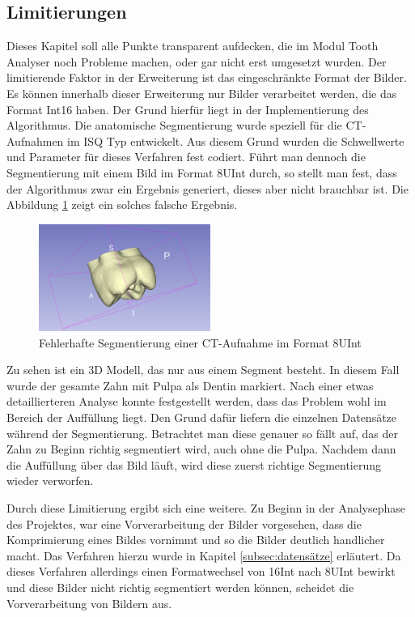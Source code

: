 \subsection{Limitierungen}
\label{sec:limitierungen} Dieses Kapitel soll alle Punkte transparent aufdecken,
die im Modul Tooth Analyser noch Probleme machen, oder gar nicht erst umgesetzt wurden.
Der limitierende Faktor in der Erweiterung ist das eingeschränkte Format der
Bilder. Es können innerhalb dieser Erweiterung nur Bilder verarbeitet werden,
die das Format \ac{Int16} haben. Der Grund hierfür liegt in der Implementierung
des Algorithmus. Die anatomische Segmentierung wurde speziell für die \ac{CT}-Aufnahmen
im \ac{ISQ} Typ entwickelt. Aus diesem Grund wurden die Schwellwerte und
Parameter für dieses Verfahren fest codiert. Führt man dennoch die Segmentierung
mit einem Bild im Format \ac{8UInt} durch, so stellt man fest, dass der
Algorithmus zwar ein Ergebnis generiert, dieses aber nicht brauchbar ist. Die
Abbildung \ref{fig:3d_error} zeigt ein solches falsche Ergebnis.

\begin{figure}[h]
	\centering
	\includegraphics[width=0.5\textwidth]{img/3d_view_error.png}
	\caption{Fehlerhafte Segmentierung einer \ac{CT}-Aufnahme im Format \ac{8UInt}}
	\label{fig:3d_error}
\end{figure}

Zu sehen ist ein 3D Modell, das nur aus einem Segment besteht. In diesem Fall wurde
der gesamte Zahn mit Pulpa als Dentin markiert. Nach einer etwas detaillierteren
Analyse konnte festgestellt werden, dass das Problem wohl im Bereich der Auffüllung
liegt. Den Grund dafür liefern die einzelnen Datensätze während der
Segmentierung. Betrachtet man diese genauer so fällt auf, das der Zahn zu Beginn
richtig segmentiert wird, auch ohne die Pulpa. Nachdem dann die Auffüllung über
das Bild läuft, wird diese zuerst richtige Segmentierung wieder verworfen.

Durch diese Limitierung ergibt sich eine weitere. Zu Beginn in der Analysephase
des Projektes, war eine Vorverarbeitung der Bilder vorgesehen, dass die
Komprimierung eines Bildes vornimmt und so die Bilder deutlich handlicher macht.
Das Verfahren hierzu wurde in Kapitel \ref{subsec:datensätze} erläutert. Da
dieses Verfahren allerdings einen Formatwechsel von \ac{16Int} nach \ac{8UInt}
bewirkt und diese Bilder nicht richtig segmentiert werden können, scheidet die Vorverarbeitung
von Bildern aus.

